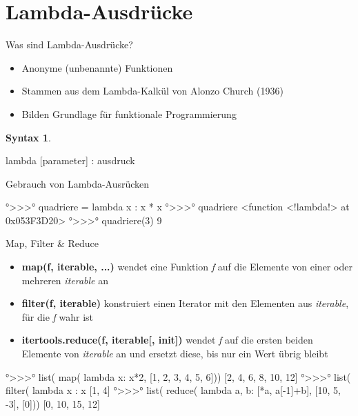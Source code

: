 \documentclass[ngerman]{beamer}
\theoremstyle{definition}
\newtheorem{syntax}{Syntax}
\begin{document}
\section{Lambda-Ausdrücke}

\begin{frame}[fragile]{Was sind Lambda-Ausdrücke?}
  \begin{itemize}
  \item {
    Anonyme (unbenannte) Funktionen
  }
  \item {
    Stammen aus dem \alert{Lambda-Kalkül} von Alonzo Church (1936)
  }
  \item {
  	Bilden Grundlage für funktionale Programmierung  
  }
  
  \end{itemize}
  \begin{syntax}
  	\begin{python}[numbers=none]
		lambda [parameter] : ausdruck
  	\end{python}
  \end{syntax}
\end{frame}

\begin{frame}{Gebrauch von Lambda-Ausrücken}
	\begin{example}
		\begin{python}[numbers=none]
°>>>° quadriere = lambda x : x * x
°>>>° quadriere
<function <!lambda!> at 0x053F3D20>
°>>>° quadriere(3)
9
		\end{python}
	\end{example}
\end{frame}
\begin{frame}{Map, Filter \& Reduce}
	\begin{itemize}
		\item {\textbf{map(f, iterable, ...)} wendet eine Funktion \emph{f} auf die Elemente von einer oder mehreren \emph{iterable} an}
		\item {\textbf{filter(f, iterable)} konstruiert einen Iterator mit den Elementen aus \emph{iterable}, für die \emph{f} wahr ist}
		\item {\textbf{itertools.reduce(f, iterable[, init])} wendet \emph{f} auf die ersten beiden Elemente von \emph{iterable} an und ersetzt diese, bis nur ein Wert übrig bleibt}
	\end{itemize}
	\framebreak
	\begin{example}
		\begin{python}[numbers=none]
°>>>° list( map( lambda x: x*2, [1, 2, 3, 4, 5, 6]))
[2, 4, 6, 8, 10, 12]
°>>>° list( filter( lambda x : x%
[1, 4]
°>>>° list( reduce( lambda a, b: [*a, a[-1]+b], [10, 5, -3], [0]))
[0, 10, 15, 12]
		\end{python}
	\end{example}


\end{frame}
\end{document}
